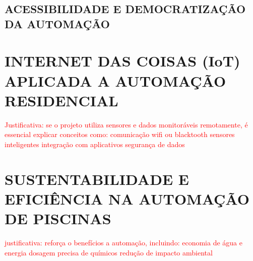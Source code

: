     \subsection{ACESSIBILIDADE E DEMOCRATIZAÇÃO DA AUTOMAÇÃO}


\section{INTERNET DAS COISAS (IoT) APLICADA A AUTOMAÇÃO RESIDENCIAL}
    \textcolor{red}{Justificativa: se o projeto utiliza sensores e dados monitoráveis remotamente, é essencial explicar conceitos como:
        comunicação wifi ou blacktooth
        sensores inteligentes
        integração com aplicativos
        segurança de dados}

\section{SUSTENTABILIDADE E EFICIÊNCIA NA AUTOMAÇÃO DE PISCINAS}
    \textcolor{red}{justificativa: reforça o benefícios a automação, incluindo:
        economia de água e energia
        dosagem precisa de químicos
        redução de impacto ambiental}

